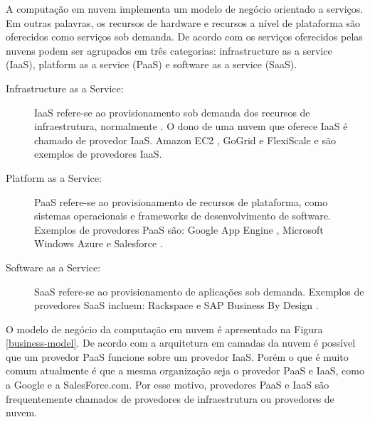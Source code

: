 A computação em nuvem implementa um modelo de negócio orientado a serviços. Em outras palavras, os recursos de hardware e recursos a nível de plataforma são oferecidos como serviços sob demanda. De acordo com \citep{stateOfArt:2010} os serviços oferecidos pelas nuvens podem ser agrupados em três categorias: infrastructure as a service (IaaS), platform as a service (PaaS) e software as a service (SaaS).

\begin{description}

\item[Infrastructure as a Service:] IaaS refere-se ao provisionamento sob
    demanda dos recursos de infraestrutura, normalmente . O dono de uma nuvem que
    oferece IaaS é chamado de provedor IaaS. Amazon EC2
    \cite{AmazonEC2:Online}, GoGrid \cite{GoGrid:Online} e FlexiScale
    \citep{Aguiar:2005} e \cite{FlexiScale:Online} são exemplos de provedores IaaS.

\item [Platform as a Service:] PaaS refere-se ao provisionamento de recursos de plataforma, como sistemas operacionais e frameworks de desenvolvimento de software. Exemplos de provedores PaaS são: Google App Engine \cite{GoogleAppEngine:Online}, Microsoft Windows Azure \cite{MicrosoftAzure:Online} e Salesforce \cite{Salesforce:Online}.

\item[Software as a Service:] SaaS refere-se ao provisionamento de aplicações sob demanda. Exemplos de provedores SaaS incluem: Rackspace \cite{Rackspace:Online} e SAP Business By Design \cite{SAP:Online}.

\end{description}


O modelo de negócio da computação em nuvem é apresentado na Figura
\ref{business-model}. De acordo com a arquitetura em camadas da nuvem é
possível que um provedor PaaS funcione sobre um provedor IaaS. Porém o que é
muito comum atualmente é que a mesma organização seja o provedor PaaS e IaaS,
como a Google e a SalesForce.com. Por esse motivo, provedores PaaS e IaaS são frequentemente chamados de provedores de infraestrutura ou provedores de nuvem.

